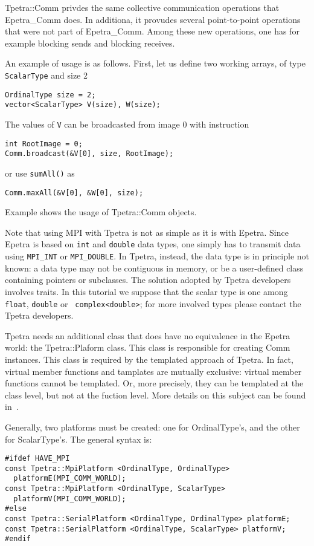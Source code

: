 Tpetra::Comm privdes the same collective communication operations that
Epetra\_Comm does. In additiona, it provudes several point-to-point operations
that were not part of Epetra\_Comm. Among these new operations, one has for
example blocking sends and blocking receives.

An example of usage is as follows. First, let us define two working arrays, of
type {\tt ScalarType} and size 2
\begin{verbatim}
OrdinalType size = 2;
vector<ScalarType> V(size), W(size);
\end{verbatim}
The values of {\tt V} can be broadcasted from image 0 with instruction
\begin{verbatim}
int RootImage = 0;
Comm.broadcast(&V[0], size, RootImage);
\end{verbatim}
or use {\tt sumAll()} as
\begin{verbatim}
Comm.maxAll(&V[0], &W[0], size);
\end{verbatim}
Example  shows the usage of Tpetra::Comm objects.

\begin{remark}
Note that using MPI with Tpetra is not as simple as it is with Epetra. Since
Epetra is based on {\tt int} and {\tt double} data types, one simply has to
transmit data using {\tt MPI\_INT} or {\tt MPI\_DOUBLE}. In Tpetra, instead,
the data type is in principle not known: a data type may not be contiguous in
memory, or be a user-defined class containing pointers or subclasses. The
solution adopted by Tpetra developers involves traits. In this tutorial we
suppose that the scalar type is one among {\tt float}, {\tt double} or {\tt
  complex<double>}; for more involved types please contact the Tpetra
  developers.
\end{remark}

\medskip

Tpetra needs an additional class that does have no equivalence in the Epetra
world: the
Tpetra::Plaform class. This class is responsible for creating Comm instances.
This class is required by the templated approach of Tpetra. In fact, virtual
member functions and tamplates are mutually exclusive: virtual member
functions cannot be templated. Or, more precisely, they can be templated at
the class level, but not at the fuction level. More details on this subject
can be found in~\cite{tpetra_overview}.

Generally, two platforms must be created: one for OrdinalType's, and the other
for ScalarType's. The general syntax is:
\begin{verbatim}
#ifdef HAVE_MPI
const Tpetra::MpiPlatform <OrdinalType, OrdinalType>
  platformE(MPI_COMM_WORLD);
const Tpetra::MpiPlatform <OrdinalType, ScalarType>
  platformV(MPI_COMM_WORLD);
#else
const Tpetra::SerialPlatform <OrdinalType, OrdinalType> platformE;
const Tpetra::SerialPlatform <OrdinalType, ScalarType> platformV;
#endif
\end{verbatim}

